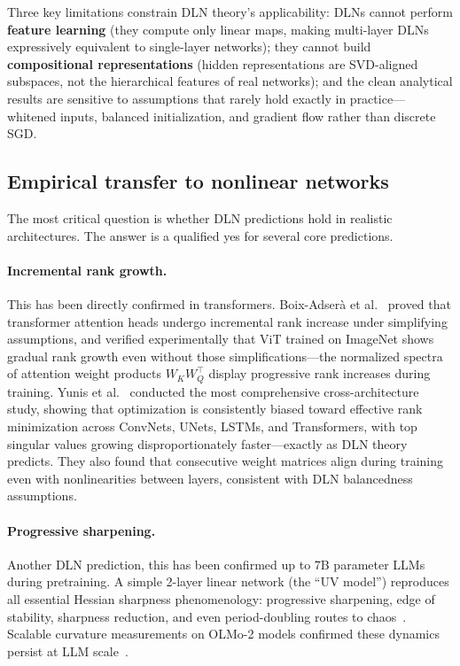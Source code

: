 \documentclass{article}
\theoremstyle{definition}
\begin{document}
Three key limitations constrain DLN theory's applicability: DLNs cannot perform \textbf{feature learning} (they compute only linear maps, making multi-layer DLNs expressively equivalent to single-layer networks); they cannot build \textbf{compositional representations} (hidden representations are SVD-aligned subspaces, not the hierarchical features of real networks); and the clean analytical results are sensitive to assumptions that rarely hold exactly in practice---whitened inputs, balanced initialization, and gradient flow rather than discrete SGD.

\subsection{Empirical transfer to nonlinear networks}

The most critical question is whether DLN predictions hold in realistic architectures. The answer is a qualified yes for several core predictions.

\paragraph{Incremental rank growth.} This has been directly confirmed in transformers. Boix-Adser\`a et al.~\cite{boixadsera2023transformers} proved that transformer attention heads undergo incremental rank increase under simplifying assumptions, and verified experimentally that ViT trained on ImageNet shows gradual rank growth even without those simplifications---the normalized spectra of attention weight products $W_K W_Q^\top$ display progressive rank increases during training. Yunis et al.~\cite{yunis2024spectral} conducted the most comprehensive cross-architecture study, showing that optimization is consistently biased toward effective rank minimization across ConvNets, UNets, LSTMs, and Transformers, with top singular values growing disproportionately faster---exactly as DLN theory predicts. They also found that consecutive weight matrices align during training even with nonlinearities between layers, consistent with DLN balancedness assumptions.

\paragraph{Progressive sharpening.} Another DLN prediction, this has been confirmed up to 7B parameter LLMs during pretraining. A simple 2-layer linear network (the ``UV model'') reproduces all essential Hessian sharpness phenomenology: progressive sharpening, edge of stability, sharpness reduction, and even period-doubling routes to chaos~\cite{chen2024universal}. Scalable curvature measurements on OLMo-2 models confirmed these dynamics persist at LLM scale~\cite{scalablecurvature2025}.
\end{document}
